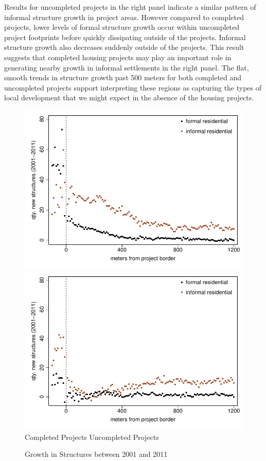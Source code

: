 \documentclass[12pt]{article}
\begin{document}
Results for uncompleted projects in the right panel indicate a similar pattern of informal structure growth in project areas.  However compared to completed projects, lower levels of formal structure growth occur within uncompleted project footprints before quickly dissipating outside of the projects.  Informal structure growth also decreases suddenly outside of the projects.  This result suggests that completed housing projects may play an important role in generating nearby growth in informal settlements in the right panel.  The flat, smooth trends in structure growth past 500 meters for both completed and uncompleted projects support interpreting these regions as capturing the types of local development that we might expect in the absence of the housing projects.

\begin{figure}
\caption{Growth in Structures between 2001 and 2011}\label{figure:buildingchanges}
\centering
\includegraphics[scale=.58]{figures/bbluplot.pdf}
\includegraphics[scale=.58]{figures/bbluplot_placebo.pdf}\\
\hspace{.7cm} Completed Projects \hspace{4.2cm} Uncompleted Projects
\end{figure}
\end{document}
